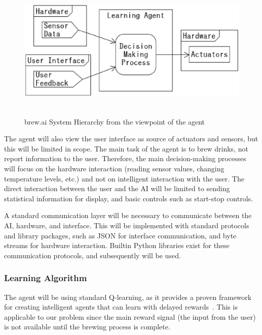 \documentclass[draftclsnofoot,onecolumn,letterpaper,10pt]{IEEEtran}
\begin{document}
\begin{figure}[h]\label{fig:AIsystemDesign}
\begin{center}
	\caption{brew.ai System Hierarchy from the viewpoint of the agent}
	\includegraphics[height=18em]{highView.eps}
\end{center}
\end{figure}

The agent will also view the user interface as source of actuators and sensors, but this will be limited in scope.
The main task of the agent is to brew drinks, not report information to the user.
Therefore, the main decision-making processes will focus on the hardware interaction (reading sensor values, changing temperature levels, etc.) and not on intelligent interaction with the user.
The direct interaction between the user and the AI will be limited to sending statistical information for display, and basic controls such as start-stop controls.

A standard communication layer will be necessary to communicate between the AI, hardware, and interface.
This will be implemented with standard protocols and library packages, such as JSON for interface communication, and byte streams for hardware interaction.
Builtin Python libraries exist for these communication protocols, and subsequently will be used.

\subsubsection{Learning Algorithm} 
The agent will be using standard Q-learning, as it provides a proven framework for creating intelligent agents that can learn with delayed rewards~\cite{SuttonBarto}.
This is applicable to our problem since the main reward signal (the input from the user) is not available until the brewing process is complete.
\end{document}
